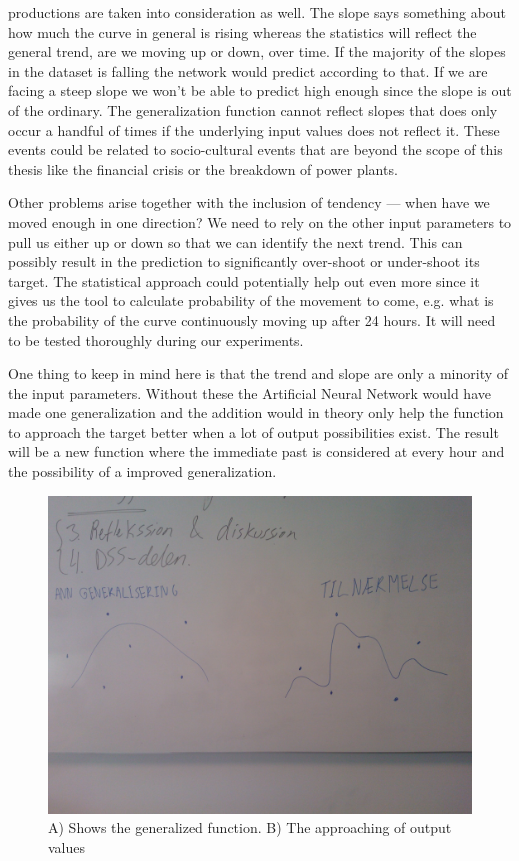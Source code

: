 productions are taken into consideration as well. The slope says something about how much the curve in general is rising whereas the statistics will reflect the general trend, are we moving up or down, over time. If the majority of the slopes in the dataset is falling the network would predict according to that. If we are facing a steep slope we won't be able to predict high enough since the slope is out of the ordinary. The generalization function cannot reflect slopes that does only occur a handful of times if the underlying input values does not reflect it. These events could be related to socio-cultural events that are beyond the scope of this thesis like the financial crisis or the breakdown of power plants.

Other problems arise together with the inclusion of tendency --- when have we moved enough in one direction? We need to rely on the other input parameters to pull us either up or down so that we can identify the next trend. This can possibly result in the prediction to significantly over-shoot or under-shoot its target. The statistical approach could potentially help out even more since it gives us the tool to calculate probability of the movement to come, e.g. what is the probability of the curve continuously moving up after 24 hours. It will need to be tested thoroughly during our experiments. 

One thing to keep in mind here is that the trend and slope are only a minority of the input parameters. Without these the Artificial Neural Network would have made one generalization and the addition would in theory only help the function to approach the target better when a lot of output possibilities exist. The result will be a new function where the immediate past is considered at every hour and the possibility of a improved generalization.

\begin{figure}[H]
\centering
\includegraphics[width=0.99\linewidth,natwidth=898,natheight=587]{billeder/WP_000057.jpg}
\caption{A) Shows the generalized function. B) The approaching of output values}
\label{fig:WP}
\end{figure}

